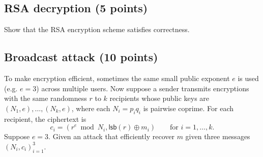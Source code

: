 \documentclass{article}
\begin{document}
\subsection{RSA decryption (5 points)} 
Show that the RSA encryption scheme satisfies correctness.

\subsection{Broadcast attack (10 points)}
To make encryption efficient, sometimes the same small public exponent $e$ is used (e.g. $e = 3$) across multiple users. Now suppose a sender transmits encryptions with the same randomness $r$ to $k$ recipients whose public keys are $(N_1, e), \dots, (N_k, e)$, where each $N_i = p_i q_i$ is pairwise coprime. 
For each recipient, the ciphertext is
    \[ c_i = (r^e \bmod{N_i}, \mathsf{lsb}(r) \oplus m_i) \qquad \text{for } i = 1, \dots, k. \]
Suppose $e = 3$. Given an attack that efficiently recover $m$ given three messages $(N_i, c_i)_{i=1}^3$.
\end{document}
